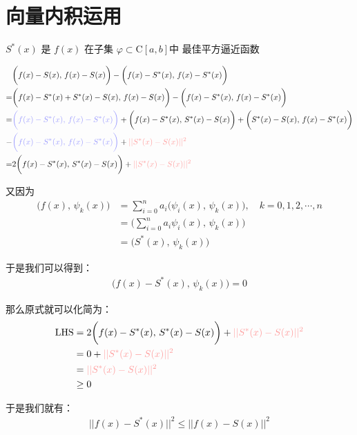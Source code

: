 \section{向量内积运用}

$\displaystyle  S^*(x)$  是 $f(x)$ 在子集 $\varphi\subset \mathrm{C}[a, b]$中
最佳平方逼近函数

\begin{align*}
    &\biggl(f(x)-S(x),\, f(x)-S(x)\biggr) - \biggl(f(x)-S^*(x),\, f(x)-S^*(x)\biggr) \\
    = & \biggl(f(x)-S^*(x)+S^*(x)-S(x),\, f(x)-S(x)\biggr) - \biggl(f(x)-S^*(x),\, f(x)-S^*(x)\biggr)\\
    = & {\color{blue!40} \biggl(f(x)-S^*(x),\, f(x)-S^*(x)\biggr)} 
        + \biggl(f(x)-S^*(x),\, S^*(x)-S(x)\biggr)
        + \biggl(S^*(x)-S(x),\, f(x)-S^*(x)\biggr)\\
    - & {\color{blue!40} \biggl(f(x)-S^*(x),\, f(x)-S^*(x)\biggr)}
        + {\color{red!40} ||S^*(x)-S(x)||^2 }\\
    = & 2 \biggl(f(x)-S^*(x),\, S^*(x)-S(x)\biggr) + {\color{red!40} ||S^*(x)-S(x)||^2 }
\end{align*}

又因为 
\begin{align*}
    \biggl(f(x),\, \psi_k(x)\biggr) 
    & = \sum_{i=0}^{n}{a_i\biggl(\psi_i(x),\, \psi_k(x)\biggr)}, \quad k = 0, 1, 2, \cdots, n\\
    & = \biggl(\sum_{i=0}^{n}{a_i\psi_i(x)},\, \psi_k(x)\biggr) \\
    & = \biggl(S^*(x),\, \psi_k(x)\biggr)
\end{align*}

于是我们可以得到：
\begin{align}
    \biggl(f(x)-S^*(x),\, \psi_k(x)\biggr) = 0
\end{align}

那么原式就可以化简为：
\begin{align*}
    \mathrm {LHS} 
    & = 2 \biggl(f(x)-S^*(x),\, S^*(x)-S(x)\biggr) + {\color{red!40} ||S^*(x)-S(x)||^2 }\\
    & = 0 + {\color{red!40} ||S^*(x)-S(x)||^2 }\\
    & = {\color{red!40} ||S^*(x)-S(x)||^2 } \\
    & \ge 0  
\end{align*}


于是我们就有：
\begin{align}
    {\bigg|\bigg|f(x)-S^*(x)\bigg|\bigg|^2 \le \bigg|\bigg|f(x) - S(x)\bigg|\bigg|^2} 
\end{align}